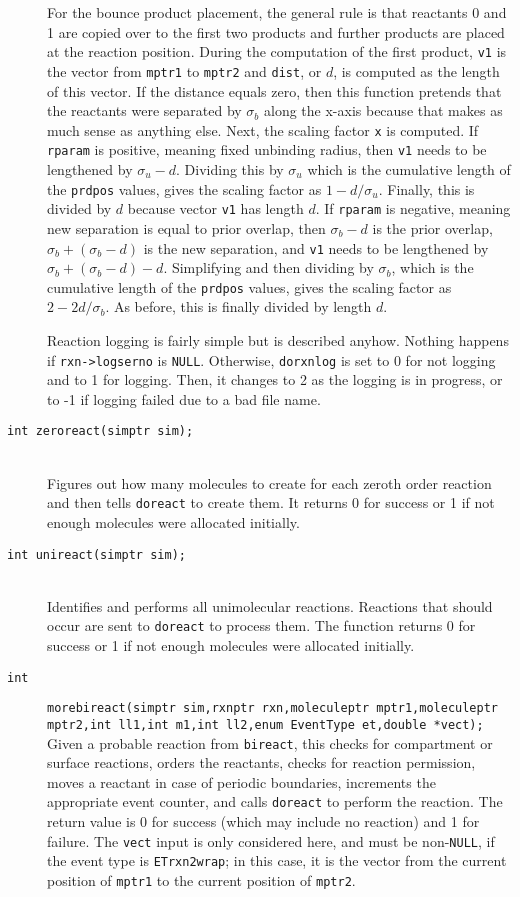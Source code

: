 \documentclass {scrbook}
\newcommand {\ttt} {\texttt}
\begin{document}
\begin{description}
For the bounce product placement, the general rule is that reactants 0 and 1 are copied over to the first two products and further products are placed at the reaction position. During the computation of the first product, \ttt{v1} is the vector from \ttt{mptr1} to \ttt{mptr2} and \ttt{dist}, or $d$, is computed as the length of this vector. If the distance equals zero, then this function pretends that the reactants were separated by $\sigma_b$ along the x-axis because that makes as much sense as anything else. Next, the scaling factor \ttt{x} is computed. If \ttt{rparam} is positive, meaning fixed unbinding radius, then \ttt{v1} needs to be lengthened by $\sigma_u-d$. Dividing this by $\sigma_u$ which is the cumulative length of the \ttt{prdpos} values, gives the scaling factor as $1-d/\sigma_u$. Finally, this is divided by $d$ because vector \ttt{v1} has length $d$. If \ttt{rparam} is negative, meaning new separation is equal to prior overlap, then $\sigma_b-d$ is the prior overlap, $\sigma_b+(\sigma_b-d)$ is the new separation, and \ttt{v1} needs to be lengthened by $\sigma_b+(\sigma_b-d)-d$. Simplifying and then dividing by $\sigma_b$, which is the cumulative length of the \ttt{prdpos} values, gives the scaling factor as $2-2d/\sigma_b$. As before, this is finally divided by length $d$.

Reaction logging is fairly simple but is described anyhow. Nothing happens if \ttt{rxn->logserno} is \ttt{NULL}. Otherwise, \ttt{dorxnlog} is set to 0 for not logging and to 1 for logging. Then, it changes to 2 as the logging is in progress, or to -1 if logging failed due to a bad file name.

\item[\ttt{int zeroreact(simptr sim);}]
\hfill \\
Figures out how many molecules to create for each zeroth order reaction and then tells \ttt{doreact} to create them. It returns 0 for success or 1 if not enough molecules were allocated initially.

\item[\ttt{int unireact(simptr sim);}]
\hfill \\
Identifies and performs all unimolecular reactions. Reactions that should occur are sent to \ttt{doreact} to process them. The function returns 0 for success or 1 if not enough molecules were allocated initially.

\item[\ttt{int}]
\ttt{morebireact(simptr sim,rxnptr rxn,moleculeptr mptr1,moleculeptr mptr2,int ll1,int m1,int ll2,enum EventType et,double *vect);} \\
Given a probable reaction from \ttt{bireact}, this checks for compartment or surface reactions, orders the reactants, checks for reaction permission, moves a reactant in case of periodic boundaries, increments the appropriate event counter, and calls \ttt{doreact} to perform the reaction. The return value is 0 for success (which may include no reaction) and 1 for failure. The \ttt{vect} input is only considered here, and must be non-\ttt{NULL}, if the event type is \ttt{ETrxn2wrap}; in this case, it is the vector from the current position of \ttt{mptr1} to the current position of \ttt{mptr2}.


\end{description}
\end{document}
